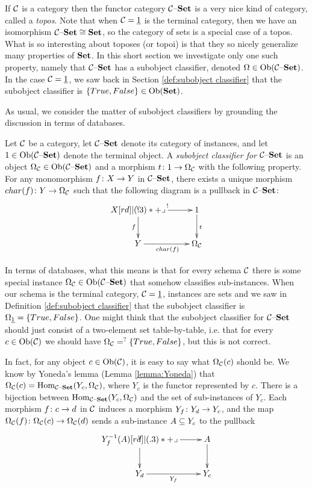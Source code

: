 \documentclass[CT4S-EN-RU]{subfiles}
\begin{document}
If $\mcC$ is a category then the functor category $\mcC\set$ is a very nice kind of category, called a {\em topos}. Note that when $\mcC=\ul{1}$ is the terminal category, then we have an isomorphism $\mcC\set\iso\Set$, so the category of sets is a special case of a topos. What is so interesting about toposes (or topoi) is that they so nicely generalize many properties of $\Set$. In this short section we investigate only one such property, namely that $\mcC\set$ has a subobject classifier, denoted $\Omega\in\Ob(\mcC\set)$. In the case $\mcC=\ul{1}$, we saw back in Section \ref{def:subobject classifier} that the subobject classifier is $\{True,False\}\in\Ob(\Set)$. 

As usual, we consider the matter of subobject classifiers by grounding the discussion in terms of databases.

\begin{definition}

Let $\mcC$ be a category, let $\mcC\set$ denote its category of instances, and let $1\in\Ob(\mcC\set)$ denote the terminal object. A {\em subobject classifier for $\mcC\set$} is an object $\Omega_\mcC\in\Ob(\mcC\set)$ and a morphism $t\taking 1\to\Omega_\mcC$ with the following property. For any monomorphism $f\taking X\to Y$ in $\mcC\set$, there exists a unique morphism $char(f)\taking Y\to\Omega_\mcC$ such that the following diagram is a pullback in $\mcC\set$:
$$
\xymatrix@=25pt{X\ar[r]^{!}\ar[d]_f\ullimit&1\ar[d]^t\\Y\ar[r]_{char(f)}&\Omega_\mcC
}
$$

\end{definition}

In terms of databases, what this means is that for every schema $\mcC$ there is some special instance $\Omega_\mcC\in\Ob(\mcC\set)$ that somehow classifies sub-instances. When our schema is the terminal category, $\mcC=\ul{1}$, instances are sets and we saw in Definition \ref{def:subobject classifier} that the subobject classifier is $\Omega_{\ul{1}}=\{True, False\}$. One might think that the subobject classifier for $\mcC\set$ should just consist of a two-element set table-by-table, i.e. that for every $c\in\Ob(\mcC)$ we should have $\Omega_{\mcC}=^?\{True,False\}$, but this is not correct. 

In fact, for any object $c\in\Ob(\mcC)$, it is easy to say what $\Omega_\mcC(c)$ should be. We know by Yoneda's lemma (Lemma \ref{lemma:Yoneda}) that $\Omega_\mcC(c)=\Hom_{\mcC\set}(Y_c,\Omega_\mcC)$, where $Y_c$ is the functor represented by $c$. There is a bijection between $\Hom_{\mcC\set}(Y_c,\Omega_\mcC)$ and the set of sub-instances of $Y_c$. Each morphism $f\taking c\to d$ in $\mcC$ induces a morphism $Y_f\taking Y_d\to Y_c$, and the map $\Omega_\mcC(f)\taking\Omega_\mcC(c)\to\Omega_\mcC(d)$ sends a sub-instance $A\ss Y_c$ to the pullback 
$$
\xymatrix{Y_f^\m1(A)\ar[r]\ar[d]\ullimit&A\ar[d]\\Y_d\ar[r]_{Y_f}&Y_c}
$$
\end{document}
